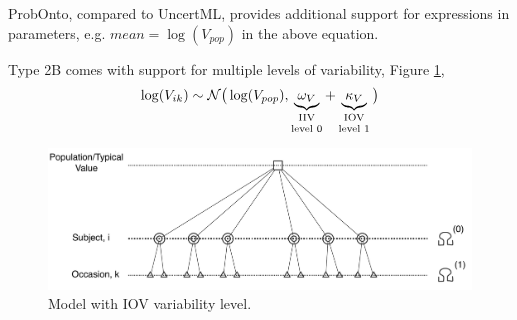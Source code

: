 \begin{note}   ProbOnto, compared to UncertML, provides additional support for 
expressions in parameters, e.g. $mean = \log(V_{pop})$ in the above equation.
\end{note}

\begin{note} Type 2B comes with support for multiple levels of variability, Figure \ref{fig:IOVtree},
\begin{align*}
\log(V_{ik}) \sim \mathcal N\big(\log(V_{pop}), \underbrace{\omega_V}_{\text{\parbox{.8cm}{\centering IIV\\[-4pt] level 0}}} +  \underbrace{\kappa_V}_{\text{\parbox{.8cm}{\centering IOV\\[-4pt] level 1}}}\big)
\end{align*}
\end{note}


\begin{figure}[htb!]
\centering
 \includegraphics[width=120mm]{pics/IOV_2levels}
\caption{Model with IOV variability level.}
\vspace{-1em}
\label{fig:IOVtree}
\end{figure}


